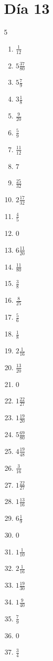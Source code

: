 \documentclass[12pt]{article}
\begin{document}
\section*{Día 13}
\begin{multicols}{5}\begin{enumerate}
\item $ \frac{1}{12} $
\item $ 5 \frac{37}{80} $
\item $ 5 \frac{7}{9} $
\item $ 3 \frac{1}{8} $
\item $ \frac{9}{20} $
\item $ \frac{5}{9} $
\item $ \frac{11}{12} $
\item $ 7 $
\item $ \frac{25}{32} $
\item $ 2 \frac{17}{32} $
\item $ \frac{4}{5} $
\item $ 0 $
\item $ 6 \frac{11}{20} $
\item $ \frac{11}{80} $
\item $ \frac{3}{8} $
\item $ \frac{8}{25} $
\item $ \frac{5}{6} $
\item $ \frac{1}{8} $
\item $ 2 \frac{1}{16} $
\item $ \frac{13}{20} $
\item $ 0 $
\item $ 1 \frac{22}{27} $
\item $ 1 \frac{19}{20} $
\item $ 5 \frac{69}{80} $
\item $ 4 \frac{19}{48} $
\item $ \frac{3}{16} $
\item $ 1 \frac{22}{27} $
\item $ 1 \frac{13}{16} $
\item $ 6 \frac{1}{9} $
\item $ 0 $
\item $ 1 \frac{1}{10} $
\item $ 2 \frac{1}{16} $
\item $ 1 \frac{19}{30} $
\item $ 1 \frac{9}{40} $
\item $ \frac{7}{9} $
\item $ 0 $
\item $ \frac{3}{4} $

\end{enumerate}
\end{multicols}
\end{document}
